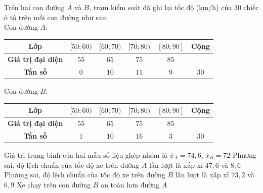 \begin{ex}%
	Trên hai con đường $A$ và $B$, trạm kiểm soát đã ghi lại tốc độ (km/h) của $30$ chiếc ô tô trên mỗi con đường như sau:\\
	Con đường $A$:
	\begin{center}
		\begin{tabular}{|c|c|c|c|c|c|}
			\hline 
			\bf Lớp &$[50;60)$ &$[60;70)$ &$[70;80)$&$[80;90]$& Cộng\\ 
			\hline
			\bf Giá trị đại diện &$55$&$65$&$75$&$85$&\\
			\hline
			\bf Tần số &$0$&$10$&$11$&$9$&$30$\\
			\hline
		\end{tabular}
	\end{center}
	Con đường $B$:
	\begin{center}
		\begin{tabular}{|c|c|c|c|c|c|}
			\hline 
			\bf Lớp &$[50;60)$ &$[60;70)$ &$[70;80)$&$[80;90]$& Cộng\\ 
			\hline
			\bf Giá trị đại diện &$55$&$65$&$75$&$85$&\\
			\hline
			\bf Tần số &$1$&$10$&$16$&$3$&$30$\\
			\hline
		\end{tabular}
	\end{center}
	\choiceTF
	{\True Giá trị trung bình của hai mẫu số liệu ghép nhóm là $\overline{x}_A=74{,}6$, $\overline{x}_B=72$}
	{Phương sai, độ lệch chuẩn của tốc độ xe trên đường $A$ lần lượt là xấp xỉ $47{,}6$ và $8{,}6$}
	{Phương sai, độ lệch chuẩn của tốc độ xe trên đường $B$ lần lượt là xấp xỉ $73{,}2$ và $6{,}9$}
	{\True Xe chạy trên con đường $B$ an toàn hơn đường $A$}
\end{ex}

